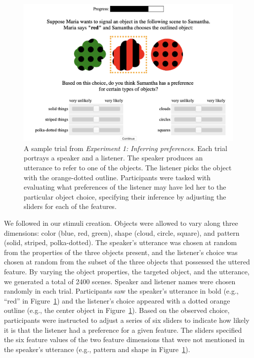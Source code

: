 \documentclass[11pt,a4paper]{article}
\begin{document}
\begin{figure}[ht]
	\centering
	\includegraphics[width=4.5in]{images/preference-trial.png}
	\caption{ \small{A sample trial from \emph{Experiment 1: Inferring preferences}. Each trial portrays a speaker and a listener. The speaker produces an utterance to refer to one of the objects. The listener picks the object with the orange-dotted outline. Participants were tasked with evaluating what preferences of the listener may have led her to the particular object choice, specifying their inference by adjusting the sliders for each of the features}.}
	\label{exp1-trial}
\end{figure}

We followed  in our stimuli creation. Objects were allowed to vary along three dimensions: color (blue, red, green), shape (cloud, circle, square), and pattern (solid, striped, polka-dotted). The speaker's utterance was chosen at random from the properties of the three objects present, and the listener's choice was chosen at random from the subset of the three objects that possessed the uttered feature. By varying the object properties, the targeted object, and the utterance, we generated a total of 2400 scenes. Speaker and listener names were chosen randomly in each trial. Participants saw the speaker's utterance in bold (e.g., ``red'' in Figure~\ref{exp1-trial}) and the listener's choice appeared with a dotted orange outline (e.g., the center object in Figure~\ref{exp1-trial}). Based on the observed choice, participants were instructed to adjust a series of six sliders to indicate how likely it is that the listener had a preference for a given feature. The sliders specified the six feature values of the two feature dimensions that were not mentioned in the speaker's utterance (e.g., pattern and shape in Figure~\ref{exp1-trial}). 
\end{document}
